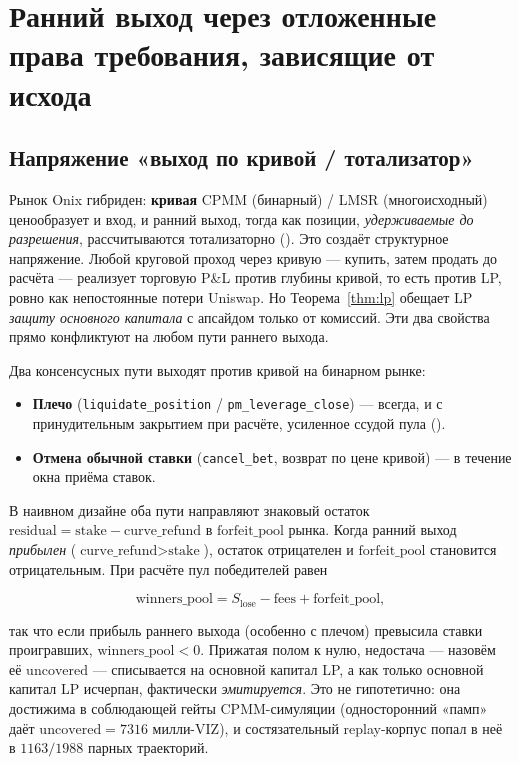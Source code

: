 \documentclass{ledger}
\theoremstyle{plain}
\theoremstyle{remark}
\begin{document}
\section{Ранний выход через отложенные права требования, зависящие от исхода}\label{sec:earlyexit}

\subsection{Напряжение «выход по кривой / тотализатор»}\label{sec:exittension}

Рынок Onix гибриден: \textbf{кривая} CPMM (бинарный) / LMSR (многоисходный)
ценообразует и вход, и ранний выход, тогда как позиции, \emph{удерживаемые до
разрешения}, рассчитываются тотализаторно (). Это создаёт
структурное напряжение. Любой круговой проход через кривую --- купить, затем продать
до расчёта --- реализует торговую P\&L против глубины кривой, то есть против LP,
ровно как непостоянные потери Uniswap. Но Теорема~\ref{thm:lp} обещает LP
\emph{защиту основного капитала} с апсайдом только от комиссий. Эти два свойства
прямо конфликтуют на любом пути раннего выхода.

Два консенсусных пути выходят против кривой на бинарном рынке:

\begin{itemize}
  \item \textbf{Плечо} (\texttt{liquidate\_position} / \texttt{pm\_leverage\_close})
  --- всегда, и с принудительным закрытием при расчёте, усиленное ссудой пула
  ().
  \item \textbf{Отмена обычной ставки} (\texttt{cancel\_bet}, возврат по цене кривой)
  --- в течение окна приёма ставок.
\end{itemize}

В наивном дизайне оба пути направляют знаковый остаток
$\text{residual} = \text{stake} - \text{curve\_refund}$ в $\text{forfeit\_pool}$
рынка. Когда ранний выход \emph{прибылен} ($\text{curve\_refund} > \text{stake}$),
остаток отрицателен и $\text{forfeit\_pool}$ становится отрицательным. При расчёте
пул победителей равен

\[
\text{winners\_pool} = S_{\text{lose}} - \text{fees} + \text{forfeit\_pool},
\]

так что если прибыль раннего выхода (особенно с плечом) превысила ставки
проигравших, $\text{winners\_pool} < 0$. Прижатая полом к нулю, недостача --- назовём
её $\text{uncovered}$ --- списывается на основной капитал LP, а как только основной
капитал LP исчерпан, фактически \emph{эмитируется}. Это не гипотетично: она
достижима в соблюдающей гейты CPMM-симуляции (односторонний «памп» даёт
$\text{uncovered} = 7316$ милли-VIZ), и состязательный replay-корпус попал в неё в
$1163/1988$ парных траекторий.
\end{document}
